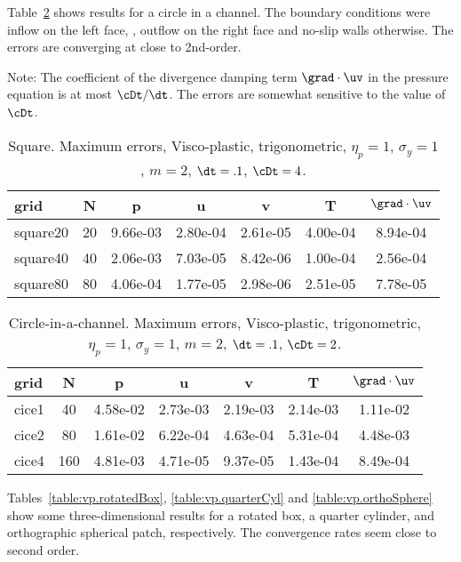 Table~\ref{table:vp.cic} shows results for a circle in a channel. 
The boundary conditions were inflow on the left face, , outflow on the right face and no-slip walls otherwise.
The errors are converging at close to 2nd-order.

Note: The coefficient of
the divergence damping term $\grad\cdot\uv$ in the pressure equation is at most $\cDt/\dt$.
The errors are somewhat sensitive to the value of $\cDt$. 


\begin{table}[hbt]
\begin{center}
\begin{tabular}{|l|c|c|c|c|c|c|} \hline
grid     & N       &  p      &  u       & v        &  T       & $\grad\cdot\uv$\\ \hline 
square20 &  20    & 9.66e-03 & 2.80e-04 & 2.61e-05 & 4.00e-04 & 8.94e-04 \\
square40 &  40    & 2.06e-03 & 7.03e-05 & 8.42e-06 & 1.00e-04 & 2.56e-04 \\ 
square80 &  80    & 4.06e-04 & 1.77e-05 & 2.98e-06 & 2.51e-05 & 7.78e-05 \\ \hline 
\end{tabular}
\caption{Square. Maximum errors, Visco-plastic, trigonometric, $\eta_p=1$, $\sigma_y=1$, $m=2$, $\dt=.1$,
$\cDt=4$.}
\label{table:vp.square}
\end{center}
\end{table}

\begin{table}[hbt]
\begin{center}
\begin{tabular}{|l|c|c|c|c|c|c|} \hline
grid     & N       &  p      &  u       & v        &  T       & $\grad\cdot\uv$\\ \hline 
cice1    & 40    & 4.58e-02 & 2.73e-03 & 2.19e-03 & 2.14e-03  & 1.11e-02  \\
cice2    & 80    & 1.61e-02 & 6.22e-04 & 4.63e-04 & 5.31e-04  & 4.48e-03  \\
cice4    & 160   & 4.81e-03 & 4.71e-05 & 9.37e-05 & 1.43e-04  & 8.49e-04  \\ \hline 
\end{tabular}
\caption{Circle-in-a-channel. Maximum errors, Visco-plastic, trigonometric, $\eta_p=1$, $\sigma_y=1$, 
$m=2$, $\dt=.1$, $\cDt=2$.}
\label{table:vp.cic}
\end{center}
\end{table}

Tables~\ref{table:vp.rotatedBox}, \ref{table:vp.quarterCyl} and
\ref{table:vp.orthoSphere} show some three-dimensional results for a rotated
box, a quarter cylinder, and orthographic spherical patch, respectively. The
convergence rates seem close to second order.

